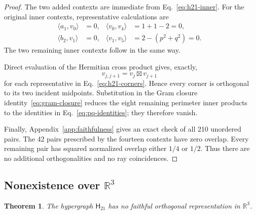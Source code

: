 \documentclass[12pt,a4paper]{article}
\newtheorem{theorem}{Theorem}
\theoremstyle{definition}
\theoremstyle{remark}
\newcommand{\R}{\mathbb R}
\newcommand{\Htwentyone}{\mathsf H_{21}}
\begin{document}
\begin{proof}
The two added contexts are immediate from Eq.~\eqref{eq:h21-inner}.
For the original inner contexts, representative calculations are
\begin{align*}
 \langle a_1,v_0\rangle&=0,&
 \langle v_0,v_4\rangle&=1+1-2=0,\\
 \langle b_2,v_1\rangle&=0,&
 \langle v_1,v_5\rangle&=2-(p^2+q^2)=0.
\end{align*}
The two remaining inner contexts follow in the same way.

Direct evaluation of the Hermitian cross product gives, exactly,
\[
 v_{j,j+1}=v_j\boxtimes v_{j+1}
\]
for each representative in Eq.~\eqref{eq:h21-corners}.  Hence every
corner is orthogonal to its two incident midpoints.  Substitution in the
Gram closure identity~\eqref{eq:gram-closure} reduces the eight remaining
perimeter inner products to the identities in
Eq.~\eqref{eq:pq-identities}; they therefore vanish.

Finally, Appendix~\ref{app:faithfulness} gives an exact check of all 210
unordered pairs.  The 42 pairs prescribed by the fourteen contexts have
zero overlap.  Every remaining pair has squared normalized overlap
either $1/4$ or $1/2$.  Thus there are no additional orthogonalities and
no ray coincidences.
\end{proof}

\subsection{Nonexistence over \texorpdfstring{$\R^3$}{R3}}

\begin{theorem}
\label{thm:h21-real}
The hypergraph $\Htwentyone$ has no faithful orthogonal representation
in $\R^3$.
\end{theorem}
\end{document}

